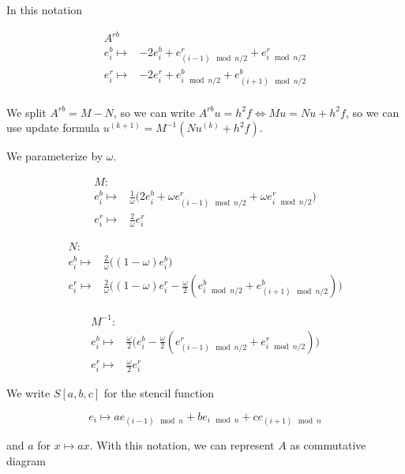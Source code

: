 \documentclass{article}
\begin{document}
\newpage

In this notation

\begin{align*}
    A^{rb} & \\
    e^b_{i} \mapsto & -2e^b_{i} + e^r_{(i - 1) \mod n / 2} + e^r_{i \mod n / 2} \\
    e^r_{i} \mapsto & -2e^r_{i} + e^b_{i \mod n / 2} + e^b_{(i + 1) \mod n / 2} \\ 
\end{align*}

We split $A^{rb} = M - N$, so we can write $A^{rb}u = h^2f \iff Mu = Nu + h^2f$,
so we can use update formula $u^{(k + 1)} = M^{-1}(Nu^{(k)} + h^2f)$.


We parameterize by $\omega$.

\begin{align*}
    M : & \\
    e^b_{i} \mapsto & \frac{1}{\omega}\big(2 e^b_{i} + \omega e^r_{(i - 1) \mod n / 2} + \omega e^r_{i \mod n / 2} \big) \\
    e^r_{i} \mapsto &  \frac{2}{\omega}e^r_{i}
\end{align*}

\begin{align*}
    N : & \\
    e^b_{i} \mapsto & \frac{2}{\omega}\big((1 - \omega)e^b_{i}\big) \\
    e^r_{i} \mapsto & \frac{2}{\omega}\big((1 - \omega)e^r_{i} -\frac{\omega}{2} (e^b_{i \mod n / 2} + e^b_{(i + 1) \mod n / 2}) \big) 
\end{align*}

\begin{align*}
    M^{-1} : & \\
    e^b_{i} \mapsto & \frac{\omega}{2}\big(e^b_{i} - \frac{\omega}{2} (e^r_{(i - 1) \mod n / 2} + e^r_{i \mod n / 2}) \big) \\
    e^r_{i} \mapsto & \frac{\omega}{2} e^r_{i}
\end{align*}

We write $S[a, b, c]$ for the stencil function 

\[
    e_i \mapsto ae_{(i - 1) \mod n} + be_{i \mod n} + c e_{(i + 1) \mod n}
\]

and $a$ for $x \mapsto ax$. With this notation, we can represent $A$ as 
commutative diagram

\end{document}
